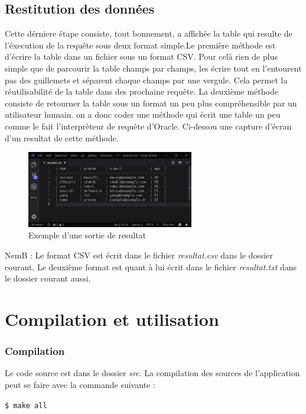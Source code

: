 \documentclass[oneside,13pt,a4paper]{report}
\newcommand\nb[1][0.3]{N\kern-#1emB : }
\begin{document}
\subsection{Restitution des données}

Cette dérniere étape consiste, tout bonnement, a affichée la table qui resulte de l'éxecution de la requête sous deux format simple.Le première méthode est d'écrire la table dans un fichier sous un format CSV. Pour celà rien de plus simple que de parcourir la table champs par champs, les écrire tout en l'entourent pas des guillemets et séparent chaque champs par une vergule. Cela permet la réutilisabilité de la table dans des prochaine requête. La deuxième méthode consiste de retourner la table sous un format un peu plus compréhensible par un utilisateur humain. on a donc coder une méthode qui écrit une table un peu comme le fait l'interprèteur de requête d'Oracle. Ci-dessou une capture d'écran d'un resultat de cette méthode.

\begin{figure}[!h]
	\centering
	\includegraphics[width=0.65\textwidth]{img/sortie.png}
	\caption{Exemple d'une sortie de resultat}
\end{figure}

\nb Le format CSV est écrit dans le fichier \textit{resultat.csv} dans le dossier courant. Le deuxième format est quant à lui écrit dans le fichier \textit{resultat.txt} dans le dossier courant aussi.

\section{Compilation et utilisation}

\subsubsection{Compilation}

Le code source est dans le dossier \textit{src}. La compilation des sources de l'application peut se faire avec la commande suivante :

\texttt{\$ make all}
\end{document}
